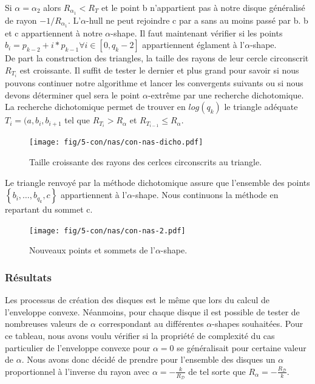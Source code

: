 Si $\alpha = \alpha_{2}$ alors \textbf{$R_{\alpha_{1}} < R_T$} et le point b n'appartient pas à notre disque généralisé de rayon $-1/R_{\alpha_{1}}$. L'$\alpha$-hull ne peut rejoindre c par a sans au moins passé par b. b et c appartiennent à notre $\alpha$-shape. Il faut maintenant vérifier si les points $b_i = p_{k-2} + i*p_{k-1} \forall i \in [0, q_k-2]$ appartiennent églament à l'$\alpha$-shape. \\

De part la construction des triangles, la taille des rayons de leur cercle circonscrit $R_{T_{i}}$ est croissante. Il suffit de tester le dernier et plus grand pour savoir si nous pouvons continuer notre algorithme et lancer les convergents suivants ou si nous devons déterminer quel sera le point $\alpha$-extrême par une recherche dichotomique. La recherche dichotomique permet de trouver en $log(q_k)$ le triangle adéquate $T_i = (a, b_{i}, b_{i+1}$ tel que $R_{T_i} > R_{\alpha}$ et $R_{T_{i-1}} \leq R_{\alpha}$.

\begin{figure}[H]
  \centering
  \texttt{[image: fig/5-con/nas/con-nas-dicho.pdf]}
  \caption{Taille croissante des rayons des cerlces circonscrits au triangle.}
\end{figure}

Le triangle renvoyé par la méthode dichotomique assure que l'ensemble des points $\left\{ b_{i},\ldots, b_{q_k}, c \right\}$ appartiennent à l'$\alpha$-shape. Nous continuons la méthode en repartant du sommet c.
 
\begin{figure}[H]
  \centering
  \texttt{[image: fig/5-con/nas/con-nas-2.pdf]}
  \caption{Nouveaux points et sommets de l'$\alpha$-shape.}
\end{figure}


\subsubsection{Résultats}

Les processus de création des disques  est le même que lors du calcul de l'enveloppe convexe. Néanmoins, pour chaque disque il est possible de tester de nombreuses valeurs de $\alpha$ correspondant au différentes $\alpha$-shapes souhaitées. Pour ce tableau, nous avons voulu vérifier si la propriété de complexité du cas particulier de l'enveloppe convexe pour $\alpha = 0$ se généralisait pour certaine valeur de $\alpha$. Nous avons donc décidé de prendre pour l'ensemble des disques un $\alpha$ proportionnel à l'inverse du rayon avec $\alpha = -\frac{k}{R_{\mathcal{D}}}$ de tel sorte que $R_{\alpha} = -\frac{R_{\mathcal{D}}}{k}$.
 

